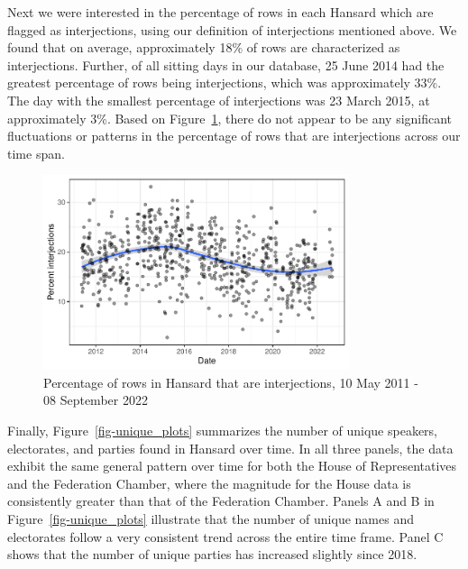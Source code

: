 \documentclass[
  letterpaper,
  DIV=11,
  numbers=noendperiod]{scrartcl}
\begin{document}
Next we were interested in the percentage of rows in each Hansard which
are flagged as interjections, using our definition of interjections
mentioned above. We found that on average, approximately 18\% of rows
are characterized as interjections. Further, of all sitting days in our
database, 25 June 2014 had the greatest percentage of rows being
interjections, which was approximately 33\%. The day with the smallest
percentage of interjections was 23 March 2015, at approximately 3\%.
Based on Figure~\ref{fig-plot3}, there do not appear to be any
significant fluctuations or patterns in the percentage of rows that are
interjections across our time span.

\begin{figure}

{\centering \includegraphics[width=0.8\textwidth,height=\textheight]{paper_files/figure-pdf/fig-plot3-1.pdf}

}

\caption{\label{fig-plot3}Percentage of rows in Hansard that are
interjections, 10 May 2011 - 08 September 2022}

\end{figure}

Finally, Figure~\ref{fig-unique_plots} summarizes the number of unique
speakers, electorates, and parties found in Hansard over time. In all
three panels, the data exhibit the same general pattern over time for
both the House of Representatives and the Federation Chamber, where the
magnitude for the House data is consistently greater than that of the
Federation Chamber. Panels A and B in Figure~\ref{fig-unique_plots}
illustrate that the number of unique names and electorates follow a very
consistent trend across the entire time frame. Panel C shows that the
number of unique parties has increased slightly since 2018.
\end{document}
